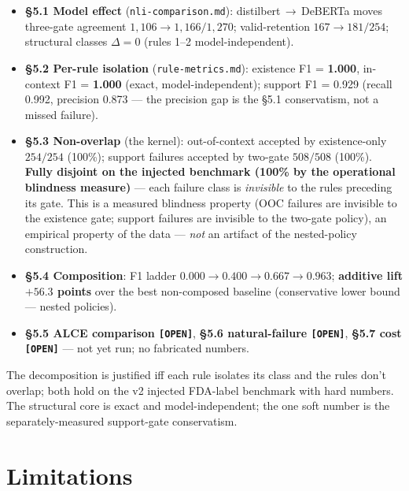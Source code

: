 \begin{itemize}
  \item \textbf{\S5.1 Model effect}
    (\texttt{nli-comparison.md}):
    distilbert\,$\to$\,DeBERTa moves three-gate agreement
    $1{,}106 \to 1{,}166/1{,}270$; valid-retention
    $167 \to 181/254$; structural classes $\Delta = 0$ (rules 1--2
    model-independent).
  \item \textbf{\S5.2 Per-rule isolation}
    (\texttt{rule-metrics.md}):
    existence F1 = \textbf{1.000}, in-context F1 = \textbf{1.000}
    (exact, model-independent); support F1 = 0.929 (recall 0.992,
    precision 0.873 --- the precision gap is the \S5.1 conservatism,
    not a missed failure).
  \item \textbf{\S5.3 Non-overlap} (the kernel): out-of-context
    accepted by existence-only $254/254$ (100\%); support failures
    accepted by two-gate $508/508$ (100\%). \textbf{Fully disjoint on
    the injected benchmark (100\% by the operational blindness
    measure)} --- each failure class is \emph{invisible} to the rules
    preceding its gate. This is a measured blindness property (OOC
    failures are invisible to the existence gate; support failures are
    invisible to the two-gate policy), an empirical property of the
    data --- \emph{not} an artifact of the nested-policy construction.
  \item \textbf{\S5.4 Composition}: F1 ladder
    $0.000 \to 0.400 \to 0.667 \to \mathbf{0.963}$; \textbf{additive
    lift $+56.3$ points} over the best non-composed baseline
    (conservative lower bound --- nested policies).
  \item \textbf{\S5.5 ALCE comparison \texttt{[OPEN]}},
    \textbf{\S5.6 natural-failure \texttt{[OPEN]}},
    \textbf{\S5.7 cost \texttt{[OPEN]}} --- not yet run; no fabricated
    numbers.
\end{itemize}

The decomposition is justified iff each rule isolates its class and
the rules don't overlap; both hold on the v2 injected FDA-label
benchmark with hard numbers. The structural core is exact and
model-independent; the one soft number is the separately-measured
support-gate conservatism.

\section{Limitations}
\label{sec:limits}

